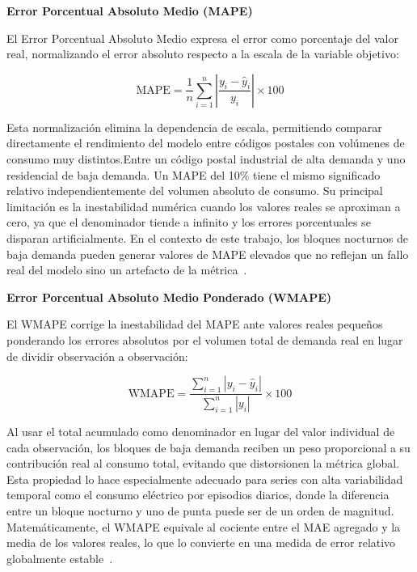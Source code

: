 \documentclass[12pt, a4paper]{article}
\begin{document}
\textbf{Error Porcentual Absoluto Medio (MAPE)}

El Error Porcentual Absoluto Medio expresa el error como porcentaje del valor real, normalizando el error absoluto respecto a la escala de la variable objetivo:

\begin{equation}
\text{MAPE} = \frac{1}{n} \sum_{i=1}^{n} \left| \frac{y_i - \hat{y}_i}{y_i} \right| \times 100
\end{equation}

Esta normalización elimina la dependencia de escala, permitiendo comparar directamente el rendimiento del modelo entre códigos postales con volúmenes de consumo muy distintos.Entre un código postal industrial de alta demanda y uno residencial de baja demanda. Un MAPE del 10\% tiene el mismo significado relativo independientemente del volumen absoluto de consumo. Su principal limitación es la inestabilidad numérica cuando los valores reales se aproximan a cero, ya que el denominador tiende a infinito y los errores porcentuales se disparan artificialmente. En el contexto de este trabajo, los bloques nocturnos de baja demanda pueden generar valores de MAPE elevados que no reflejan un fallo real del modelo sino un artefacto de la métrica~\cite{gassar2024, rubattu2023}.

\textbf{Error Porcentual Absoluto Medio Ponderado (WMAPE)}

El WMAPE corrige la inestabilidad del MAPE ante valores reales pequeños ponderando los errores absolutos por el volumen total de demanda real en lugar de dividir observación a observación:

\begin{equation}
\text{WMAPE} = \frac{\sum_{i=1}^{n} |y_i - \hat{y}_i|}{\sum_{i=1}^{n} |y_i|} \times 100
\end{equation}

Al usar el total acumulado como denominador en lugar del valor individual de cada observación, los bloques de baja demanda reciben un peso proporcional a su contribución real al consumo total, evitando que distorsionen la métrica global. Esta propiedad lo hace especialmente adecuado para series con alta variabilidad temporal como el consumo eléctrico por episodios diarios, donde la diferencia entre un bloque nocturno y uno de punta puede ser de un orden de magnitud. Matemáticamente, el WMAPE equivale al cociente entre el MAE agregado y la media de los valores reales, lo que lo convierte en una medida de error relativo globalmente estable~\cite{gassar2024, rubattu2023}.
\end{document}

